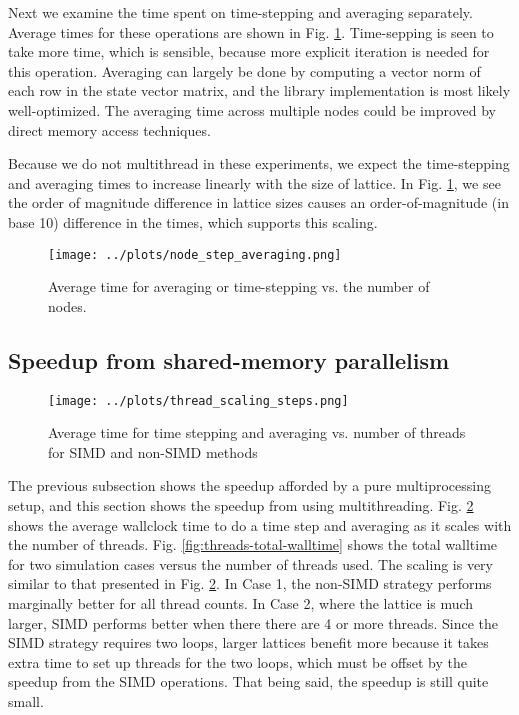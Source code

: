 \documentclass{article}
\begin{document}
Next we examine the time spent on time-stepping and averaging separately. Average times for these operations are shown in 
Fig. \ref{fig:node-average-vs-step}. Time-sepping is seen to take more time, which is sensible, because 
more explicit iteration is needed for this operation. Averaging can largely be done by computing a vector 
norm of each row in the state vector matrix, and the library implementation is most likely well-optimized. 
The averaging time across multiple nodes could be improved by direct memory access techniques.

Because we do not multithread in these experiments, we expect the time-stepping and averaging times to 
increase linearly with the size of lattice. In Fig. \ref{fig:node-average-vs-step}, we see the order of magnitude
difference in lattice sizes causes an order-of-magnitude (in base 10) difference in the times, which 
supports this scaling.

\begin{figure}
    \centering
    \texttt{[image: ../plots/node\_step\_averaging.png]}
    \caption{Average time for averaging or time-stepping vs. the number of nodes.}
    \label{fig:node-average-vs-step}
\end{figure}

\subsection{Speedup from shared-memory parallelism}

\begin{figure}
    \centering
    \texttt{[image: ../plots/thread\_scaling\_steps.png]}
    \caption{Average time for time stepping and averaging vs. number of threads for SIMD and 
    non-SIMD methods}
    \label{fig:threads-avg-step-time}
\end{figure}

The previous subsection shows the speedup afforded by a pure multiprocessing setup, and this section shows the speedup 
from using multithreading. Fig. \ref{fig:threads-avg-step-time} shows the average wallclock time to do a time 
step and averaging as it scales with the number of threads.
Fig. \ref{fig:threads-total-walltime} shows the total walltime for two simulation cases versus the number of threads used.
The scaling is very similar to that presented in Fig. \ref{fig:threads-avg-step-time}.
 In Case 1, the non-SIMD strategy performs marginally better 
for all thread counts. In Case 2, where the lattice is much larger, SIMD performs better when there there are 4 or 
more threads. Since the SIMD strategy requires two loops, larger lattices benefit more because it takes extra time
to set up threads for the two loops, which must be offset by the speedup from the SIMD operations. That being said,
the speedup is still quite small.  
\end{document}
